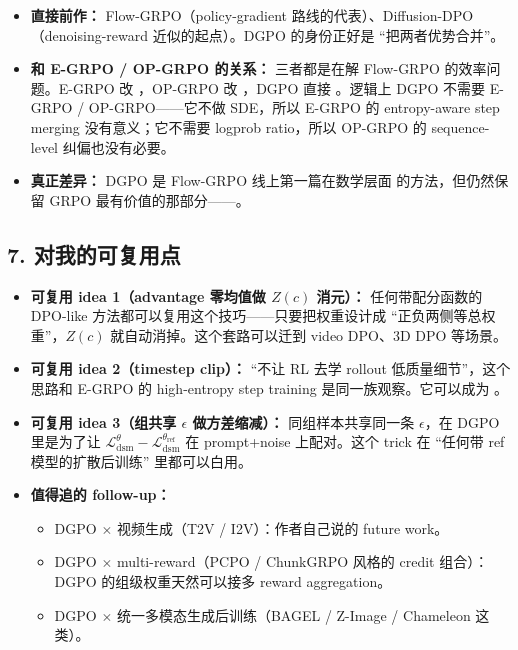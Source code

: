 \begin{itemize}[leftmargin=1.5em]
  \item \textbf{直接前作：} Flow-GRPO（policy-gradient 路线的代表）、Diffusion-DPO（denoising-reward 近似的起点）。DGPO 的身份正好是 ``把两者优势合并''。
  \item \textbf{和 E-GRPO / OP-GRPO 的关系：} 三者都是在解 Flow-GRPO 的效率问题。E-GRPO 改 ，OP-GRPO 改 ，DGPO 直接 。逻辑上 DGPO 不需要 E-GRPO / OP-GRPO——它不做 SDE，所以 E-GRPO 的 entropy-aware step merging 没有意义；它不需要 logprob ratio，所以 OP-GRPO 的 sequence-level 纠偏也没有必要。
  \item \textbf{真正差异：} DGPO 是 Flow-GRPO 线上第一篇在数学层面  的方法，但仍然保留 GRPO 最有价值的那部分——。
\end{itemize}

\subsection{7. 对我的可复用点}

\begin{itemize}[leftmargin=1.5em]
  \item \textbf{可复用 idea 1（advantage 零均值做 $Z(c)$ 消元）：} 任何带配分函数的 DPO-like 方法都可以复用这个技巧——只要把权重设计成 ``正负两侧等总权重''，$Z(c)$ 就自动消掉。这个套路可以迁到 video DPO、3D DPO 等场景。
  \item \textbf{可复用 idea 2（timestep clip）：} ``不让 RL 去学 rollout 低质量细节''，这个思路和 E-GRPO 的 high-entropy step training 是同一族观察。它可以成为 。
  \item \textbf{可复用 idea 3（组共享 $\epsilon$ 做方差缩减）：} 同组样本共享同一条 $\epsilon$，在 DGPO 里是为了让 $\mathcal{L}_{\text{dsm}}^{\theta}-\mathcal{L}_{\text{dsm}}^{\theta_{\text{ref}}}$ 在 prompt+noise 上配对。这个 trick 在 ``任何带 ref 模型的扩散后训练'' 里都可以白用。
  \item \textbf{值得追的 follow-up：}
    \begin{itemize}[leftmargin=1.5em]
      \item DGPO $\times$ 视频生成（T2V / I2V）：作者自己说的 future work。
      \item DGPO $\times$ multi-reward（PCPO / ChunkGRPO 风格的 credit 组合）：DGPO 的组级权重天然可以接多 reward aggregation。
      \item DGPO $\times$ 统一多模态生成后训练（BAGEL / Z-Image / Chameleon 这类）。
    \end{itemize}
\end{itemize}


